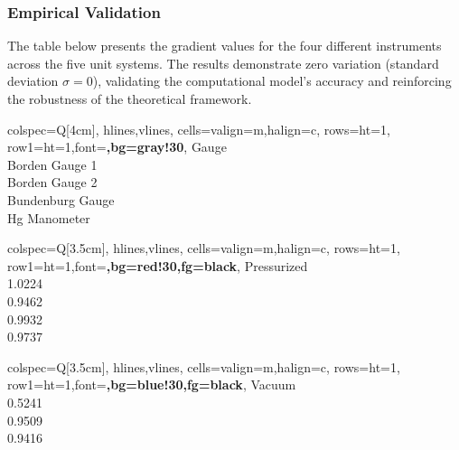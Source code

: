 \documentclass{article}
\begin{document}
\subsubsection{Empirical Validation}\label{empirical-validation}
The table below presents the gradient values for the four different instruments across the five unit systems. The results demonstrate zero variation (standard deviation $\sigma = 0$), validating the computational model's accuracy and reinforcing the robustness of the theoretical framework.
\begin{center}
	\begin{minipage}[t]{3cm}
		\centering
		\begin{tblr}{
				colspec={Q[4cm]},
				hlines,vlines,
				cells={valign=m,halign=c},
				rows={ht=1\baselineskip},
				row{1}={ht=1\baselineskip,font=\bfseries,bg=gray!30},
			}
			Gauge \\
			Borden Gauge 1 \\
			Borden Gauge 2 \\
			Bundenburg Gauge \\
			Hg Manometer \\
		\end{tblr}
	\end{minipage}
	\hspace{3.5em}
	\begin{minipage}[t]{3.5cm}
		\centering
		\begin{tblr}{
				colspec={Q[3.5cm]},
				hlines,vlines,
				cells={valign=m,halign=c},
				rows={ht=1\baselineskip},
				row{1}={ht=1\baselineskip,font=\bfseries,bg=red!30,fg=black},
			}
			Pressurized \\
			{1.0224}\\ 
			{0.9462} \\ 
			{0.9932} \\
			{0.9737} \\
		\end{tblr}
	\end{minipage}
	\hspace{1em}
	\begin{minipage}[t]{3.5cm}
		\centering
		\begin{tblr}{
				colspec={Q[3.5cm]},
				hlines,vlines,
				cells={valign=m,halign=c},
				rows={ht=1\baselineskip},
				row{1}={ht=1\baselineskip,font=\bfseries,bg=blue!30,fg=black},
			}
			Vacuum \\
			{0.5241} \\
			{0.9509} \\
			{0.9416} \\

\end{tblr}
\end{minipage}
\end{center}
\end{document}
